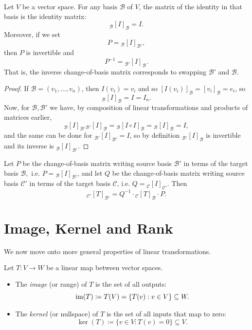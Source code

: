 \documentclass[../linear_algebra_and_groups.tex]{subfiles}
\begin{document}
\begin{corollary}
    \begin{shaded*}
        Let $V$ be a vector space. For any basis $\mathcal{B}$ of $V$, the matrix of the identity in that basis is the identity matrix: $${}_\mathcal{B}[I]_\mathcal{B}=I.$$Moreover, if we set $$P={}_\mathcal{B}[I]_{\mathcal{B}'},$$then $P$ is invertible and $$P^{-1}={}_{\mathcal{B}'}[I]_\mathcal{B}.$$That is, the inverse change-of-basis matrix corresponds to swapping $\mathcal{B}'$ and $\mathcal{B}$.
    \end{shaded*}
\end{corollary}
\begin{proof}
    If $\mathcal{B}=(v_1,\dots,v_n)$, then $I(v_i)=v_i$ and so $[I(v_i)]_\mathcal{B}=[v_i]_\mathcal{B}=e_i$, so \[{}_\mathcal{B}[I]_\mathcal{B}=I=I_n.\]
    Now, for $\mathcal{B},\mathcal{B}'$ we have, by composition of linear transformations and products of matrices earlier, \[{}_\mathcal{B}[I]_{\mathcal{B}'}{}_{\mathcal{B}'}[I]_\mathcal{B}={}_{\mathcal{B}}[I\circ I]_{\mathcal{B}}={}_\mathcal{B}[I]_\mathcal{B}=I,\]
    and the same can be done for ${}_{\mathcal{B}'}[I]_{\mathcal{B}'}=I$, so by definition ${}_{\mathcal{B}'}[I]_{\mathcal{B}}$ is invertible and its inverse is ${}_\mathcal{B}[I]_{\mathcal{B}'}.$\qedhere
\end{proof}

\begin{corollary}
    \begin{shaded*}
        Let $P$ be the change-of-basis matrix writing source basis $\mathcal{B}'$ in terms of the target basis $\mathcal{B},$ i.e. $P={}_\mathcal{B}[I]_{\mathcal{B}'}$, and let $Q$ be the change-of-basis matrix writing source basis $\mathcal{C}'$ in terms of the target basis $\mathcal{C}$, i.e. $Q={}_\mathcal{C}[I]_{\mathcal{C}'}$. Then \[{}_{\mathcal{C}'}[T]_{\mathcal{B}'}=Q^{-1}\cdot{}_\mathcal{C}[T]_\mathcal{B}\cdot P.\]
    \end{shaded*}
\end{corollary}

\section{Image, Kernel and Rank}

We now move onto more general properties of linear transformations.

\begin{definition}
    \begin{shaded*}
        Let $T:V\to W$ be a linear map between vector spaces. 
        \begin{itemize}
            \item The \textit{image} (or range) of $T$ is the set of all outputs:
            \[ \operatorname{im}(T) \coloneqq T(V) = \{T(v) : v\in V\} \subseteq W. \]
            \item The \textit{kernel} (or nullspace) of $T$ is the set of all inputs that map to zero:
            \[ \ker(T) \coloneqq \{v\in V : T(v)=0\} \subseteq V. \]
        \end{itemize}
    \end{shaded*}
\end{definition}
\end{document}
